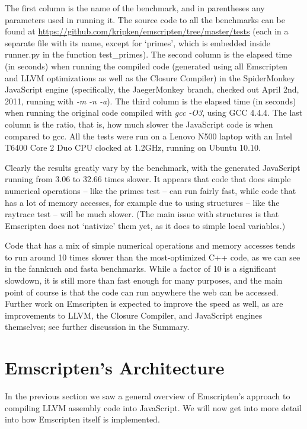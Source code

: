 \documentclass[preprint,10pt]{sigplanconf}
\begin{document}
The first column is the name of the benchmark, and in parentheses any
parameters used in running it. The source code to all the benchmarks
can be found at \url{https://github.com/kripken/emscripten/tree/master/tests}
(each in a separate file with its name, except for `primes', which is
embedded inside runner.py in the function test\_primes). The second
column is the elapsed time (in seconds) when running the compiled code (generated using all Emscripten and LLVM
optimizations as well as the Closure Compiler) in the SpiderMonkey JavaScript
engine (specifically, the JaegerMonkey branch, checked out April 2nd, 2011, running with \emph{-m -n -a}).
The third column is the elapsed time (in seconds) when running the original code compiled with \emph{gcc -O3},
using GCC 4.4.4. The last column is the ratio, that is, how much slower the JavaScript code is
when compared to gcc. All the tests were run on a Lenovo N500 laptop with
an Intel T6400 Core 2 Duo CPU clocked at 1.2GHz, running on Ubuntu 10.10.

Clearly the results greatly vary by the benchmark, with the generated JavaScript running from 3.06 to 32.66 times
slower. It appears that code that does simple numerical operations -- like
the primes test -- can run fairly fast, while code that has a lot of memory
accesses, for example due to using structures -- like the raytrace test --
will be much slower. (The main issue with structures is that Emscripten does not
`nativize' them yet, as it does to simple local variables.)

Code that has a mix of simple numerical operations and memory accesses
tends to run around 10 times slower than the most-optimized C++ code,
as we can see in the fannkuch and fasta benchmarks. While a factor of 10
is a significant slowdown, it is still more than fast enough for
many purposes, and the main point of course is that the code can run
anywhere the web can be accessed. Further work on Emscripten is expected to
improve the speed as well, as are improvements to LLVM, the Closure
Compiler, and JavaScript engines themselves; see further discussion
in the Summary.

\section{Emscripten's Architecture}
\label{sec:emarch}

In the previous section we saw a general overview of Emscripten's approach
to compiling LLVM assembly code into JavaScript. We will now get into more detail
into how Emscripten itself is implemented.
\end{document}
